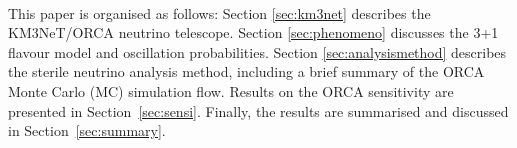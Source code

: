 \\
This paper is organised as follows: Section \ref{sec:km3net} describes the KM3NeT/ORCA neutrino telescope. Section \ref{sec:phenomeno} discusses the 3+1 flavour model and oscillation probabilities. Section \ref{sec:analysismethod} describes the sterile neutrino analysis method, including a brief summary of the ORCA Monte Carlo (MC) simulation flow. Results on the ORCA sensitivity are presented in Section~\ref{sec:sensi}. Finally, the results are summarised and discussed in Section~\ref{sec:summary}.